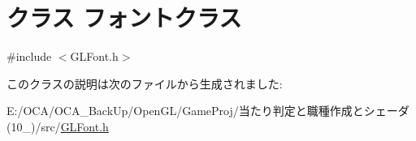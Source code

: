 \hypertarget{class_xE3_x83_x95_xE3_x82_xA9_xE3_x83_xB3_xE3_x83_x88_xE3_x82_xAF_xE3_x83_xA9_xE3_x82_xB9}{\section{クラス フォントクラス}
\label{class_xE3_x83_x95_xE3_x82_xA9_xE3_x83_xB3_xE3_x83_x88_xE3_x82_xAF_xE3_x83_xA9_xE3_x82_xB9}
}


{\ttfamily \#include $<$G\-L\-Font.\-h$>$}



このクラスの説明は次のファイルから生成されました\-:\begin{DoxyCompactItemize}
\item 
E\-:/\-O\-C\-A/\-O\-C\-A\-\_\-\-Back\-Up/\-Open\-G\-L/\-Game\-Proj/当たり判定と職種作成とシェーダ(10\-\_)/src/\hyperlink{_g_l_font_8h}{G\-L\-Font.\-h}\end{DoxyCompactItemize}
